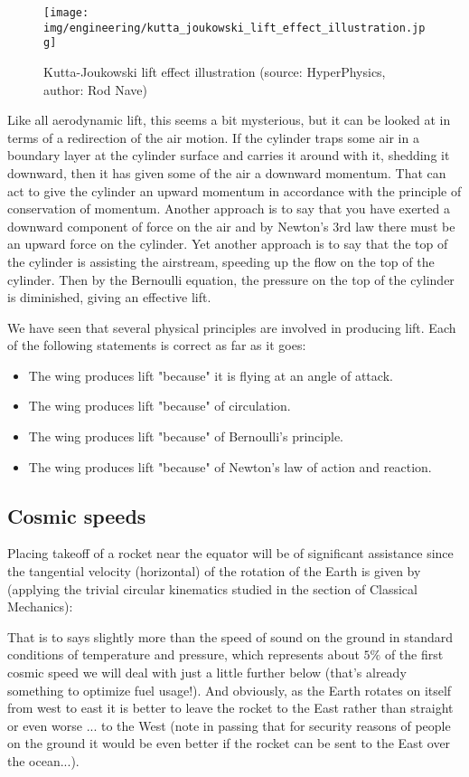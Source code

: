 	\begin{figure}[H]
		\centering
		\texttt{[image: img/engineering/kutta\_joukowski\_lift\_effect\_illustration.jpg]}
		\caption{Kutta-Joukowski lift effect illustration (source: HyperPhysics, author: Rod Nave)}
	\end{figure}
	Like all aerodynamic lift, this seems a bit mysterious, but it can be looked at in terms of a redirection of the air motion. If the cylinder traps some air in a boundary layer at the cylinder surface and carries it around with it, shedding it downward, then it has given some of the air a downward momentum. That can act to give the cylinder an upward momentum in accordance with the principle of conservation of momentum. Another approach is to say that you have exerted a downward component of force on the air and by Newton's 3rd law there must be an upward force on the cylinder. Yet another approach is to say that the top of the cylinder is assisting the airstream, speeding up the flow on the top of the cylinder. Then by the Bernoulli equation, the pressure on the top of the cylinder is diminished, giving an effective lift.
	
	We have seen that several physical principles are involved in producing lift. Each of the following statements is correct as far as it goes:
	\begin{itemize}
		\item The wing produces lift "because" it is flying at an angle of attack.
		\item The wing produces lift "because" of circulation.
		\item The wing produces lift "because" of Bernoulli's principle.
		\item The wing produces lift "because" of Newton's law of action and reaction.
	\end{itemize}

	\pagebreak
	\subsection{Cosmic speeds}
	Placing takeoff of a rocket near the equator will be of significant assistance since the tangential velocity (horizontal) of the rotation of the Earth is given by (applying the trivial circular kinematics studied in the section of Classical Mechanics):
	
	That is to says slightly more than the speed of sound on the ground in standard conditions of temperature and pressure, which represents about $5\%$ of the first cosmic speed we will deal with just a little further below (that's already something to optimize fuel usage!). And obviously, as the Earth rotates on itself from west to east it is better to leave the rocket to the East rather than straight or even worse ... to the West (note in passing that for security reasons of people on the ground it would be even better if the rocket can be sent to the East over the ocean...).
	
